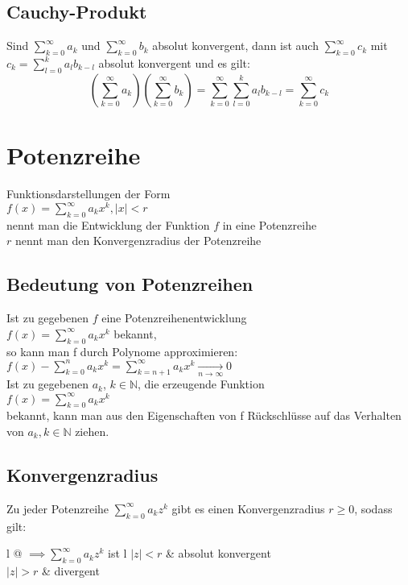 \documentclass[a4paper,9pt]{extarticle}
\newcommand{\suminfty}[1][k = 1]{\sum_{#1}^{\infty}}
\begin{document}

	\subsection*{Cauchy-Produkt}

	Sind $\suminfty[k = 0]{a_k}$ und $\suminfty[k = 0]{b_k}$ absolut konvergent, dann ist auch
	$\suminfty[k = 0]{c_k}$ mit $c_k = \sum_{l = 0}^k{a_l b_{k -l}}$ absolut konvergent und es gilt:
	$$
	(\suminfty[k = 0]{a_k}) (\suminfty[k = 0]{b_k}) = \suminfty[k = 0]{\sum_{l = 0}^k{a_l b_{k - l}}} = \suminfty[k = 0]{c_k}
	$$


	\pagebreak
\section*{Potenzreihe}
	Funktionsdarstellungen der Form \\
	$f(x) = \suminfty[k = 0] a_kx^k, |x| < r$ \\
	nennt man die Entwicklung der Funktion $f$ in eine Potenzreihe \\
	$r$ nennt man den Konvergenzradius der Potenzreihe
	
	\subsection*{Bedeutung von Potenzreihen}
	Ist zu gegebenen $f$ eine Potenzreihenentwicklung \\
	$f(x) = \suminfty[k = 0] a_kx^k$ bekannt,\\
	so kann man f durch Polynome approximieren: \\
	$f(x) - \sum_{k = 0}^n a_kx^k = \suminfty[k = n + 1] a_kx^k \xrightarrow[n → ∞]{} 0$\\
	
	Ist zu gegebenen $a_k$, $k \in \mathbb{N}$, die erzeugende Funktion \\
	$f(x) = \sum_{k = 0}^∞ a_kx^k$ \\
	bekannt, kann man aus den Eigenschaften von f Rückschlüsse auf das Verhalten von $a_k, k \in \mathbb{N}$ ziehen.
	
	\subsection*{Konvergenzradius}
	Zu jeder Potenzreihe $\suminfty[k = 0] a_kz^k$ gibt es einen Konvergenzradius $r ≥ 0$, sodass gilt: \\
	\begin{tabular}{l @ {$\implies \suminfty[k = 0] a_k z^k$ ist } l}
		$|z| < r$ & absolut konvergent \\
		$|z| > r$ & divergent
	\end{tabular}
\end{document}
